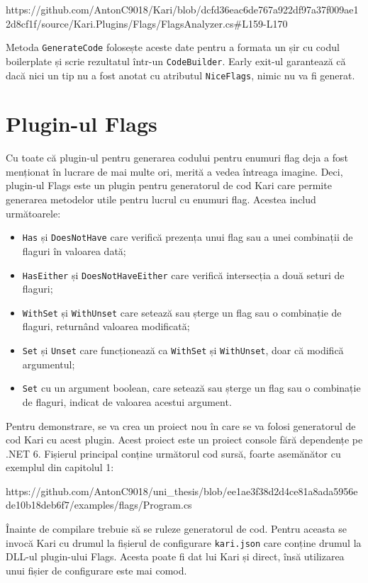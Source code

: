 \documentclass{report}
\begin{document}
https://github.com/AntonC9018/Kari/blob/dcfd36eac6de767a922df97a37f009ae12d8cf1f/source/Kari.Plugins/Flags/FlagsAnalyzer.cs#L159-L170

Metoda \texttt{GenerateCode\(\)} folosește aceste date pentru a formata un șir cu codul boilerplate și scrie rezultatul într-un \texttt{CodeBuilder}.
Early exit-ul garantează că dacă nici un tip nu a fost anotat cu atributul \texttt{NiceFlags}, nimic nu va fi generat.


\section{Plugin-ul Flags}

Cu toate că plugin-ul pentru generarea codului pentru enumuri flag deja a fost menționat în lucrare de mai multe ori, merită a vedea întreaga imagine.
Deci, plugin-ul Flags este un plugin pentru generatorul de cod Kari care permite generarea metodelor utile pentru lucrul cu enumuri flag.
Acestea includ următoarele:

\begin{itemize}
  \item \texttt{Has} și \texttt{DoesNotHave} care verifică prezența unui flag sau a unei combinații de flaguri în valoarea dată;
  \item \texttt{HasEither} și \texttt{DoesNotHaveEither} care verifică intersecția a două seturi de flaguri;
  \item \texttt{WithSet} și \texttt{WithUnset} care setează sau șterge un flag sau o combinație de flaguri, returnând valoarea modificată;
  \item \texttt{Set} și \texttt{Unset} care funcționează ca \texttt{WithSet} și \texttt{WithUnset}, doar că modifică argumentul;
  \item \texttt{Set} cu un argument boolean, care setează sau șterge un flag sau o combinație de flaguri, indicat de valoarea acestui argument.
\end{itemize}

Pentru demonstrare, se va crea un proiect nou în care se va folosi generatorul de cod Kari cu acest plugin.
Acest proiect este un proiect console fără dependențe pe .NET 6.
Fișierul principal conține următorul cod sursă, foarte asemănător cu exemplul din capitolul 1:

https://github.com/AntonC9018/uni_thesis/blob/ee1ae3f38d2d4ce81a8ada5956ede10b18deb6f7/examples/flags/Program.cs


Înainte de compilare trebuie să se ruleze generatorul de cod.
Pentru aceasta se invocă Kari cu drumul la fișierul de configurare \texttt{kari.json} care conține drumul la DLL-ul plugin-ului Flags.
Acesta poate fi dat lui Kari și direct, însă utilizarea unui fișier de configurare este mai comod.
\end{document}
